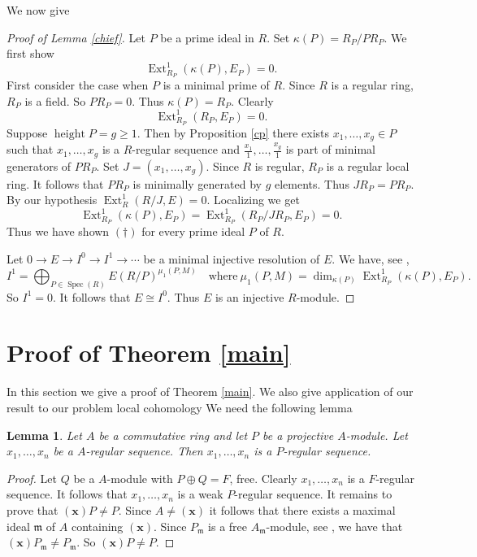 \documentclass{amsart}
\theoremstyle{plain}
\newtheorem{lemma}[theorem]{Lemma}
\theoremstyle{definition}
\theoremstyle{remark}
\numberwithin{equation}{theorem}
\begin{document}
We now give
\begin{proof}[Proof of Lemma \ref{chief}]
Let $P$ be a prime ideal in $R$. Set $\kappa(P) = R_P/PR_P$.
We first show
\begin{equation*}
{\operatorname{Ext}}^{1}_{R_P}\left( \kappa(P), E_P \right) = 0. \tag{$\dagger$}
\end{equation*}
First consider the case when $P$ is a minimal prime of $R$. Since $R$ is a regular ring, $R_P$ is a field. So $PR_P = 0$. Thus $\kappa(P) = R_P$. Clearly
\[
{\operatorname{Ext}}^{1}_{R_P}\left( R_P , E_P \right) = 0.
\]
Suppose ${\operatorname{height}} P = g \geq 1$. Then by Proposition \ref{cp} there exists $x_1,\ldots,x_g \in P$ such that $x_1,\ldots,x_g$ is a $R$-regular sequence and $\frac{x_1}{1},\ldots,\frac{x_g}{1}$ is part of minimal generators of $PR_P$. Set $J = (x_1,\ldots,x_g)$. Since $R$ is regular, $R_P$ is a regular local ring. It follows that $PR_P$ is minimally generated by $g$ elements. Thus $JR_P = PR_P$. By our hypothesis ${\operatorname{Ext}}^{1}_{R}(R/J, E) = 0$. Localizing we get
\[
{\operatorname{Ext}}^{1}_{R_P}\left( \kappa(P), E_P \right) = {\operatorname{Ext}}^{1}_{R_P}(R_P/JR_P, E_P) = 0.
\]
Thus we have shown $(\dagger)$ for every prime ideal $P$ of $R$.

Let $0 {\rightarrow} E {\rightarrow} I^0 {\rightarrow} I^1 {\rightarrow} \cdots $ be a minimal injective resolution of $E$. We have, see \cite[18.7]{M},
\[
I^1 = \bigoplus_{P \in {\operatorname{Spec}}(R)} E(R/P)^{\mu_1(P,M)} \quad \text{where} \ \mu_1(P,M) = \dim_{\kappa(P)}{\operatorname{Ext}}^{1}_{R_P}\left( \kappa(P), E_P \right).
\]
So $I^1 = 0$. It follows that $E \cong I^0$. Thus $E$ is an injective $R$-module.
\end{proof}

\section{Proof of Theorem \ref{main}}
In this section we give a proof of Theorem \ref{main}. We also give application of our result to our problem local cohomology  We need the following lemma
\begin{lemma}\label{reg}
Let $A$ be a commutative ring and let $P$ be a projective $A$-module. Let $x_1,\ldots,x_n$ be a $A$-regular sequence. Then $x_1,\ldots,x_n$ is a $P$-regular sequence.
\end{lemma}
\begin{proof}
Let $Q$ be a $A$-module with $P\oplus Q = F$, free. Clearly $x_1,\ldots,x_n$ is a $F$-regular sequence. It follows that
$x_1,\ldots,x_n$ is a weak $P$-regular sequence. It remains to prove that $({\mathbf{x}})P \neq P$. Since $A \neq ({\mathbf{x}})$ it follows that there exists a maximal ideal ${\mathfrak{m} }$ of $A$ containing $({\mathbf{x}})$. Since $P_{\mathfrak{m} }$ is a free $A_{\mathfrak{m} }$-module, see \cite[Theorem 2.5]{M}, we have
that $({\mathbf{x}})P_{\mathfrak{m} } \neq P_{\mathfrak{m} }$. So $({\mathbf{x}})P \neq P$.
\end{proof}
\end{document}
